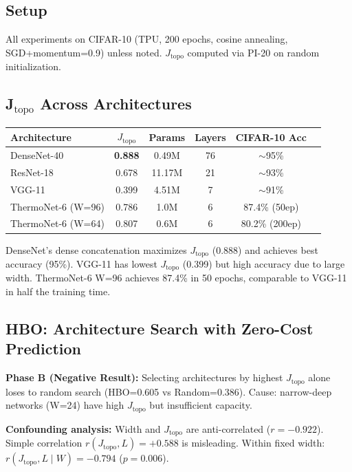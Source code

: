 \documentclass[11pt, a4paper]{article}
\theoremstyle{plain}
\begin{document}
\subsection{Setup}
All experiments on CIFAR-10 (TPU, 200 epochs, cosine annealing, SGD+momentum=0.9) unless noted. $J_{\mathrm{topo}}$ computed via PI-20 on random initialization.

\subsection{J$_{\mathrm{topo}}$ Across Architectures}

\begin{center}
\begin{tabular}{lccccc}
\toprule
Architecture & $J_{\mathrm{topo}}$ & Params & Layers & CIFAR-10 Acc \\
\midrule
DenseNet-40 & \textbf{0.888} & 0.49M & 76 & $\sim$95\% \\
ResNet-18 & 0.678 & 11.17M & 21 & $\sim$93\% \\
VGG-11 & 0.399 & 4.51M & 7 & $\sim$91\% \\
ThermoNet-6 (W=96) & 0.786 & 1.0M & 6 & 87.4\% (50ep) \\
ThermoNet-6 (W=64) & 0.807 & 0.6M & 6 & 80.2\% (200ep) \\
\bottomrule
\end{tabular}
\end{center}

DenseNet's dense concatenation maximizes $J_{\mathrm{topo}}$ (0.888) and achieves best accuracy (95\%). VGG-11 has lowest $J_{\mathrm{topo}}$ (0.399) but high accuracy due to large width. ThermoNet-6 W=96 achieves 87.4\% in 50 epochs, comparable to VGG-11 in half the training time.

\subsection{HBO: Architecture Search with Zero-Cost Prediction}

\textbf{Phase B (Negative Result):} Selecting architectures by highest $J_{\mathrm{topo}}$ alone loses to random search (HBO=0.605 vs Random=0.386). Cause: narrow-deep networks (W=24) have high $J_{\mathrm{topo}}$ but insufficient capacity.

\textbf{Confounding analysis:} Width and $J_{\mathrm{topo}}$ are anti-correlated ($r = -0.922$). Simple correlation $r(J_{\mathrm{topo}}, L) = +0.588$ is misleading. Within fixed width: $r(J_{\mathrm{topo}}, L \mid W) = -0.794$ ($p=0.006$).
\end{document}
